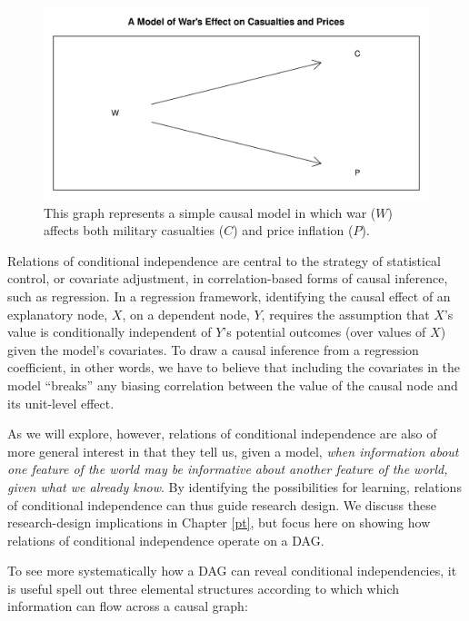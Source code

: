 \documentclass[
  12pt,
]{book}
\begin{document}
\begin{figure}

{\centering \includegraphics[width=0.6\linewidth]{ii_files/figure-latex/warDAG-1} 

}

\caption{This graph represents a simple causal model in which war ($W$) affects both military casualties ($C$) and price inflation ($P$).}\label{fig:warDAG}
\end{figure}

Relations of conditional independence are central to the strategy of statistical control, or covariate adjustment, in correlation-based forms of causal inference, such as regression. In a regression framework, identifying the causal effect of an explanatory node, \(X\), on a dependent node, \(Y\), requires the assumption that \(X\)'s value is conditionally independent of \(Y\)'s potential outcomes (over values of \(X\)) given the model's covariates. To draw a causal inference from a regression coefficient, in other words, we have to believe that including the covariates in the model ``breaks'' any biasing correlation between the value of the causal node and its unit-level effect.

As we will explore, however, relations of conditional independence are also of more general interest in that they tell us, given a model, \emph{when information about one feature of the world may be informative about another feature of the world, given what we already know}. By identifying the possibilities for learning, relations of conditional independence can thus guide research design. We discuss these research-design implications in Chapter \ref{pt}, but focus here on showing how relations of conditional independence operate on a DAG.

To see more systematically how a DAG can reveal conditional independencies, it is useful spell out three elemental structures according to which which information can flow across a causal graph:
\end{document}
